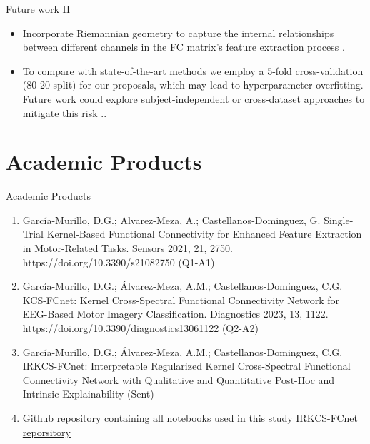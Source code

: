 \documentclass[aspectratio=169]{beamer}
\let\oldcite\cite %
\renewcommand{\cite}[1]{{\tiny\oldcite{#1}}}
\begin{document}
\begin{frame}{Future work II}
    \begin{itemize}
        \item Incorporate Riemannian geometry to capture the internal relationships between different channels in the FC matrix's feature extraction process \cite{carrara2023classification}.
        \vspace{2em}
        \item To compare with state-of-the-art methods we employ a 5-fold cross-validation (80-20 split) for our proposals, which may lead to hyperparameter overfitting. Future work could explore subject-independent or cross-dataset approaches to mitigate this risk \cite{wei2023sub}..
    \end{itemize}
\end{frame}

\section{Academic Products}

\begin{frame}{Academic Products}
    \begin{enumerate}
        \item García-Murillo, D.G.; Alvarez-Meza, A.; Castellanos-Dominguez, G. Single-Trial Kernel-Based Functional Connectivity for Enhanced Feature Extraction in Motor-Related Tasks. Sensors 2021, 21, 2750. https://doi.org/10.3390/s21082750 (Q1-A1)
    
        \item García-Murillo, D.G.; Álvarez-Meza, A.M.; Castellanos-Dominguez, C.G. KCS-FCnet: Kernel Cross-Spectral Functional Connectivity Network for EEG-Based Motor Imagery Classification. Diagnostics 2023, 13, 1122. https://doi.org/10.3390/diagnostics13061122 (Q2-A2)
    
        \item García-Murillo, D.G.; Álvarez-Meza, A.M.; Castellanos-Dominguez, C.G. IRKCS-FCnet: Interpretable Regularized Kernel Cross-Spectral Functional Connectivity Network with Qualitative and Quantitative Post-Hoc and Intrinsic Explainability (Sent)
    
        \item Github repository containing all notebooks used in this study  \href{https://github.com/dggarciam/PhD_code_reposotory}{IRKCS-FCnet reporsitory}
    \end{enumerate}
\end{frame}
\end{document}

